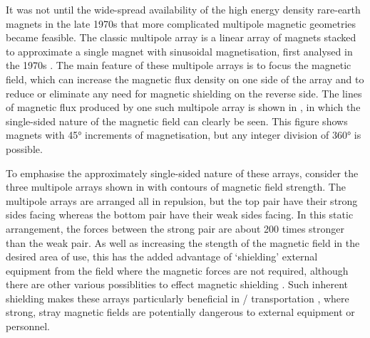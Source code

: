 \documentclass[11pt,a4paper]{memoir}
\begin{document}
It was not until the wide-spread availability of the high energy density rare-earth magnets in the late 1970s that more complicated multipole magnetic geometries became feasible.
The classic multipole array is a linear array of magnets stacked to approximate a single magnet with sinusoidal magnetisation, first analysed in the 1970s \parencite{halbach1981,shute2000-ietm}.
The main feature of these multipole arrays is to focus the magnetic field, which can increase the magnetic flux density on one side of the array and to reduce or eliminate any need for magnetic shielding on the reverse side.
The lines of magnetic flux produced by one such multipole array is shown in , in which the single-sided nature of the magnetic field can clearly be seen.
This figure shows magnets with \ang{45} increments of magnetisation, but any integer division of \ang{360} is possible.

To emphasise the approximately single-sided nature of these arrays, consider the three multipole arrays shown in  with contours of magnetic field strength.
The multipole arrays are arranged all in repulsion, but the top pair have their strong sides facing whereas the bottom pair have their weak sides facing.
In this static arrangement, the forces between the strong pair are about 200 times stronger than the weak pair.
As well as increasing the stength of the magnetic field in the desired area of use, this has the added advantage of `shielding' external equipment from the field where the magnetic forces are not required, although there are other various possiblities to effect magnetic shielding \cite{becherini2009}.
Such inherent shielding makes these arrays particularly beneficial in \maglev/ transportation \cite{hoburg2004}, where strong, stray magnetic fields are potentially dangerous to external equipment or personnel.

\begin{figure}
   \centering
\end{figure}
\end{document}
